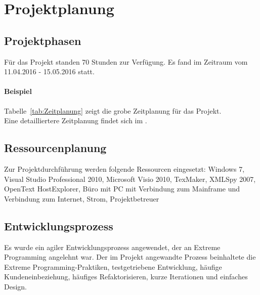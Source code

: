 \section{Projektplanung}
\label{sec:Projektplanung}


\subsection{Projektphasen}
\label{sec:Projektphasen}
Für das Projekt standen 70 Stunden zur Verfügung. Es fand im Zeitraum vom 11.04.2016 - 15.05.2016 statt.

\paragraph{Beispiel}
Tabelle~\ref{tab:Zeitplanung} zeigt die grobe Zeitplanung für das Projekt.
\\
Eine detailliertere Zeitplanung findet sich im .

\subsection{Ressourcenplanung}
\label{sec:Ressourcenplanung}
Zur Projektdurchführung werden folgende Ressourcen eingesetzt:
Windows 7, Visual Studio Professional 2010, Microsoft Visio 2010, TexMaker, XMLSpy 2007, OpenText HostExplorer, Büro mit PC mit Verbindung zum Mainframe und Verbindung zum  Internet, Strom, Projektbetreuer


\subsection{Entwicklungsprozess}
\label{sec:Entwicklungsprozess}
Es wurde ein agiler Entwicklungsprozess angewendet, der an Extreme Programming angelehnt war. Der im Projekt angewandte Prozess beinhaltete die Extreme Programming-Praktiken, testgetriebene Entwicklung, häufige Kundeneinbeziehung, häufiges Refaktorisieren, kurze Iterationen und einfaches Design. 






